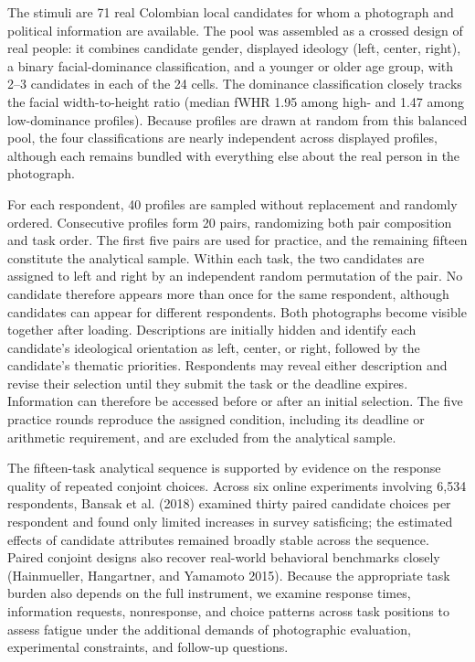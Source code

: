 \documentclass[11pt]{article}\usepackage[]{graphicx}\usepackage[]{xcolor}
\begin{document}
The stimuli are 71 real Colombian local candidates for whom a photograph and political information are available. The pool was assembled as a crossed design of real people: it combines candidate gender, displayed ideology (left, center, right), a binary facial-dominance classification, and a younger or older age group, with 2--3 candidates in each of the 24 cells. The dominance classification closely tracks the facial width-to-height ratio (median fWHR 1.95 among high- and 1.47 among low-dominance profiles). Because profiles are drawn at random from this balanced pool, the four classifications are nearly independent across displayed profiles, although each remains bundled with everything else about the real person in the photograph.

For each respondent, 40 profiles are sampled without replacement and randomly ordered. Consecutive profiles form 20 pairs, randomizing both pair composition and task order. The first five pairs are used for practice, and the remaining fifteen constitute the analytical sample. Within each task, the two candidates are assigned to left and right by an independent random permutation of the pair. No candidate therefore appears more than once for the same respondent, although candidates can appear for different respondents. Both photographs become visible together after loading. Descriptions are initially hidden and identify each candidate's ideological orientation as left, center, or right, followed by the candidate's thematic priorities. Respondents may reveal either description and revise their selection until they submit the task or the deadline expires. Information can therefore be accessed before or after an initial selection. The five practice rounds reproduce the assigned condition, including its deadline or arithmetic requirement, and are excluded from the analytical sample.

The fifteen-task analytical sequence is supported by evidence on the response quality of repeated conjoint choices. Across six online experiments involving 6,534 respondents, Bansak et al. (2018) examined thirty paired candidate choices per respondent and found only limited increases in survey satisficing; the estimated effects of candidate attributes remained broadly stable across the sequence. Paired conjoint designs also recover real-world behavioral benchmarks closely (Hainmueller, Hangartner, and Yamamoto 2015). Because the appropriate task burden also depends on the full instrument, we examine response times, information requests, nonresponse, and choice patterns across task positions to assess fatigue under the additional demands of photographic evaluation, experimental constraints, and follow-up questions.
\end{document}
